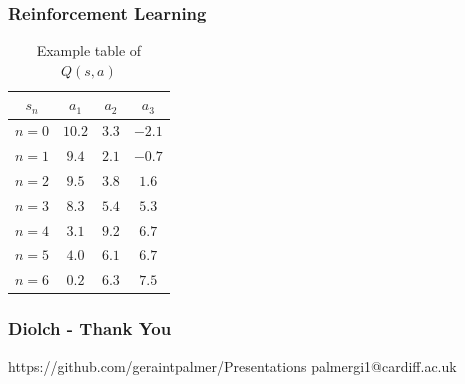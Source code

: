 \documentclass[xcolor={table}]{beamer}
\begin{document}
\begin{frame}
  \frametitle{Reinforcement Learning}

  \begin{table}

  \begin{tabular}{ | c | c | c | c | }
  \hline
  $s_n$ & $a_1$ & $a_2$ & $a_3$ \\
  \hline
  $n = 0$ & \cellcolor{green} $10.2$ & $3.3$ & $-2.1$ \\
  $n = 1$ & \cellcolor{green} $9.4$ & $2.1$ & $-0.7$ \\
  $n = 2$ & \cellcolor{green} $9.5$ & $3.8$ & $1.6$ \\
  $n = 3$ & \cellcolor{green} $8.3$ & $5.4$ & $5.3$ \\
  $n = 4$ & $3.1$ & \cellcolor{green} $9.2$ & $6.7$ \\
  $n = 5$ & $4.0$ & $6.1$ & \cellcolor{green} $6.7$ \\
  $n = 6$ & $0.2$ & $6.3$ & \cellcolor{green} $7.5$ \\
  \hline
  \end{tabular}
  \caption{Example table of $Q(s, a)$}
  \end{table}
\end{frame}

\begin{frame}
    \frametitle{Diolch - Thank You}
    https://github.com/geraintpalmer/Presentations
    palmergi1@cardiff.ac.uk
\end{frame}
\end{document}
